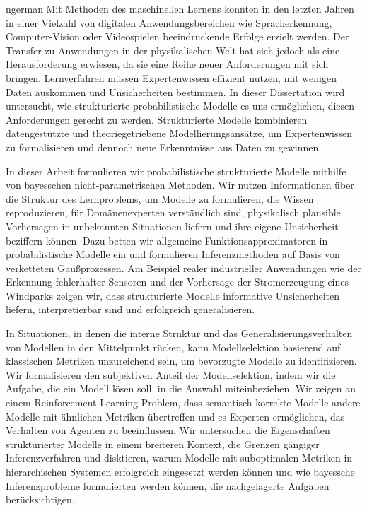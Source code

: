 \begin{titlepage}
    
\end{titlepage}

\begin{titlepage}
    
\end{titlepage}

\begin{Abstract}{ngerman}
    Mit Methoden des maschinellen Lernens konnten in den letzten Jahren in einer Vielzahl von digitalen Anwendungsbereichen wie Spracherkennung, Computer-Vision oder Videospielen beeindruckende Erfolge erzielt werden.
    Der Transfer zu Anwendungen in der physikalischen Welt hat sich jedoch als eine Herausforderung erwiesen, da sie eine Reihe neuer Anforderungen mit sich bringen.
    Lernverfahren müssen Expertenwissen effizient nutzen, mit wenigen Daten auskommen und Unsicherheiten bestimmen.
    In dieser Dissertation wird untersucht, wie strukturierte probabilistische Modelle es uns ermöglichen, diesen Anforderungen gerecht zu werden.
    Strukturierte Modelle kombinieren datengestützte und theoriegetriebene Modellierungsansätze, um Expertenwissen zu formalisieren und dennoch neue Erkenntnisse aus Daten zu gewinnen.

    In dieser Arbeit formulieren wir probabilistische strukturierte Modelle mithilfe von bayesschen nicht-parametrischen Methoden.
    Wir nutzen Informationen über die Struktur des Lernproblems, um Modelle zu formulieren, die Wissen reproduzieren, für Domänenexperten verständlich sind, physikalisch plausible Vorhersagen in unbekannten Situationen liefern und ihre eigene Unsicherheit beziffern können.
    Dazu betten wir allgemeine Funktionsapproximatoren in probabilistische Modelle ein und formulieren Inferenzmethoden auf Basis von verketteten Gaußprozessen.
    Am Beispiel realer industrieller Anwendungen wie der Erkennung fehlerhafter Sensoren und der Vorhersage der Stromerzeugung eines Windparks zeigen wir, dass strukturierte Modelle informative Unsicherheiten liefern, interpretierbar sind und erfolgreich generalisieren.

    In Situationen, in denen die interne Struktur und das Generalisierungsverhalten von Modellen in den Mittelpunkt rücken, kann Modellselektion basierend auf klassischen Metriken unzureichend sein, um bevorzugte Modelle zu identifizieren.
    Wir formalisieren den subjektiven Anteil der Modellselektion, indem wir die Aufgabe, die ein Modell lösen soll, in die Auswahl miteinbeziehen.
    Wir zeigen an einem Reinforcement-Learning Problem, dass semantisch korrekte Modelle andere Modelle mit ähnlichen Metriken übertreffen und es Experten ermöglichen, das Verhalten von Agenten zu beeinflussen.
    Wir untersuchen die Eigenschaften strukturierter Modelle in einem breiteren Kontext, die Grenzen gängiger Inferenzverfahren und disktieren, warum Modelle mit suboptimalen Metriken in hierarchischen Systemen erfolgreich eingesetzt werden können und wie bayessche Inferenzprobleme formulierten werden können, die nachgelagerte Aufgaben berücksichtigen.
\end{Abstract}

